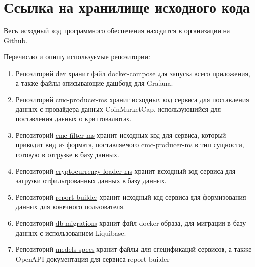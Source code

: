 \section{Ссылка на хранилище исходного кода}

Весь исходный код программного обеспечения находится в организации на \href{
      https://github.com/orgs/HSECourseWork2022/repositories}{Github}.

Перечислю и опишу используемые репозитории:
\begin{enumerate}
      \item Репозиторий \href{https://github.com/HSECourseWork2022/dev}{dev}
            хранит файл docker-compose для запуска всего приложения, а также файлы
            описывающие дашборд для Grafana.

      \item Репозиторий \href{https://github.com/HSECourseWork2022/cmc-producer-ms}{cmc-producer-ms}
            хранит исходных код сервиса для поставления данных с провайдера данных CoinMarketCap,
            использующийся для поставления данных о криптовалютах.

      \item Репозиторий \href{https://github.com/HSECourseWork2022/cmc-filter-mus}{cmc-filter-ms}
            хранит исходных код для сервиса, который приводит вид из формата, поставляемого
            cmc-producer-ms в тип сущности, готовую в отгрузке в базу данных.

      \item Репозиторий \href{https://github.com/HSECourseWork2022/cryptocurrency-loader-ms}
            {cryptocurrency-loader-ms}
            хранит исходный код сервиса для загрузки отфильтрованных данных в базу данных.

      \item Репозиторий \href{https://github.com/HSECourseWork2022/report-builder}{report-builder}
            хранит исходный код сервиса для формирования данных для конечного пользователя.

      \item Репозиторий \href{https://github.com/HSECourseWork2022/db-migrations}{db-migrations}
            хранит файл docker образа, для миграции в базу данных с использованием Liquibase.

      \item Репозиторий \href{https://github.com/HSECourseWork2022/models-specs}{models-specs}
            хранит файлы для спецификаций сервисов, а также OpenAPI документация для сервиса report-builder

\end{enumerate}